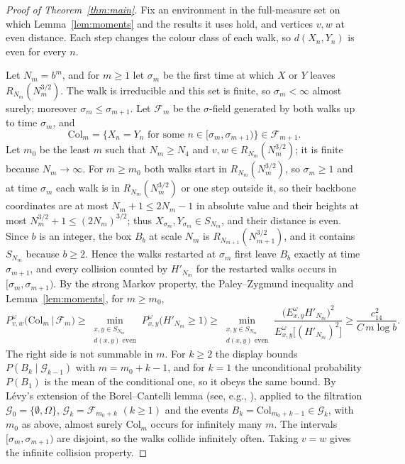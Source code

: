 \documentclass[11pt]{amsart}
\theoremstyle{remark}
\numberwithin{equation}{section}
\begin{document}
\begin{proof}[Proof of Theorem~\ref{thm:main}]
Fix an environment in the full-measure set on which Lemma~\ref{lem:moments} and the results it uses hold, and vertices $v,w$ at even distance. Each step changes the colour class of each walk, so $d(X_n,Y_n)$ is even for every $n$.

Let $N_m=b^m$, and for $m\ge1$ let $\sigma_m$ be the first time at which $X$ or $Y$ leaves $R_{N_m}(N_m^{3/2})$. The walk is irreducible and this set is finite, so $\sigma_m<\infty$ almost surely; moreover $\sigma_m\le\sigma_{m+1}$. Let $\mathcal F_m$ be the $\sigma$-field generated by both walks up to time $\sigma_m$, and
\[
\mathrm{Col}_m=\bigl\{X_n=Y_n\text{ for some }n\in[\sigma_m,\sigma_{m+1})\bigr\}\in\mathcal F_{m+1}.
\]
Let $m_0$ be the least $m$ such that $N_m\ge N_4$ and $v,w\in R_{N_m}(N_m^{3/2})$; it is finite because $N_m\to\infty$. For $m\ge m_0$ both walks start in $R_{N_m}(N_m^{3/2})$, so $\sigma_m\ge1$ and at time $\sigma_m$ each walk is in $R_{N_m}(N_m^{3/2})$ or one step outside it, so their backbone coordinates are at most $N_m+1\le2N_m-1$ in absolute value and their heights at most $N_m^{3/2}+1\le(2N_m)^{3/2}$; thus $X_{\sigma_m},Y_{\sigma_m}\in S_{N_m}$, and their distance is even. Since $b$ is an integer, the box $B_b$ at scale $N_m$ is $R_{N_{m+1}}(N_{m+1}^{3/2})$, and it contains $S_{N_m}$ because $b\ge2$. Hence the walks restarted at $\sigma_m$ first leave $B_b$ exactly at time $\sigma_{m+1}$, and every collision counted by $H'_{N_m}$ for the restarted walks occurs in $[\sigma_m,\sigma_{m+1})$. By the strong Markov property, the Paley--Zygmund inequality and Lemma~\ref{lem:moments}, for $m\ge m_0$,
\[
P^\omega_{v,w}\bigl(\mathrm{Col}_m\,\big|\,\mathcal F_m\bigr)\ge\min_{\substack{x,y\in S_{N_m}\\ d(x,y)\text{ even}}}P^\omega_{x,y}\bigl(H'_{N_m}\ge1\bigr)\ge\min_{\substack{x,y\in S_{N_m}\\ d(x,y)\text{ even}}}\frac{\bigl(E^\omega_{x,y}H'_{N_m}\bigr)^2}{E^\omega_{x,y}\bigl[(H'_{N_m})^2\bigr]}\ge\frac{c_{14}^2}{C\,m\log b}.
\]
The right side is not summable in $m$. For $k\ge2$ the display bounds $P(B_k\mid\mathcal G_{k-1})$ with $m=m_0+k-1$, and for $k=1$ the unconditional probability $P(B_1)$ is the mean of the conditional one, so it obeys the same bound. By L\'evy's extension of the Borel--Cantelli lemma (see, e.g., \cite[Theorem~4.3.4]{Durrett}), applied to the filtration $\mathcal G_0=\{\emptyset,\Omega\}$, $\mathcal G_k=\mathcal F_{m_0+k}$ $(k\ge1)$ and the events $B_k=\mathrm{Col}_{m_0+k-1}\in\mathcal G_k$, with $m_0$ as above, almost surely $\mathrm{Col}_m$ occurs for infinitely many $m$. The intervals $[\sigma_m,\sigma_{m+1})$ are disjoint, so the walks collide infinitely often. Taking $v=w$ gives the infinite collision property.
\end{proof}
\end{document}
